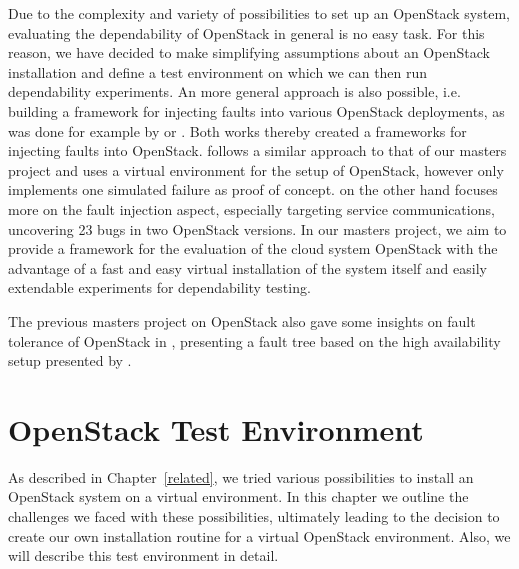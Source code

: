 \documentclass[conference]{IEEEtran}
\begin{document}
Due to the complexity and variety of possibilities to set up an OpenStack system, evaluating the dependability of OpenStack in general is no easy task. For this reason, we have decided to make simplifying assumptions about an OpenStack installation and define a test environment on which we can then run dependability experiments. An more general approach is also possible, i.e. building a framework for injecting faults into various OpenStack deployments, as was done for example by \cite{kollarova} or \cite{Ju:2013:FRO:2523616.2523622}. Both works thereby created a frameworks for injecting faults into OpenStack. \cite{kollarova} follows a similar approach to that of our masters project and uses a virtual environment for the setup of OpenStack, however only implements one simulated failure as proof of concept. \cite{Ju:2013:FRO:2523616.2523622} on the other hand focuses more on the fault injection aspect, especially targeting service communications, uncovering 23 bugs in two OpenStack versions. In our masters project, we aim to provide a framework for the evaluation of the cloud system OpenStack with the advantage of a fast and easy virtual installation of the system itself and easily extendable experiments for dependability testing.

The previous masters project on OpenStack also gave some insights on fault tolerance of OpenStack in \cite{mp14}, presenting a fault tree based on the high availability setup presented by \cite{teng}.


\section{OpenStack Test Environment}
As described in Chapter~\ref{related}, we tried various possibilities to install an OpenStack system on a virtual environment. In this chapter we outline the challenges we faced with these possibilities, ultimately leading to the decision to create our own installation routine for a virtual OpenStack environment. Also, we will describe this test environment in detail.
\end{document}
